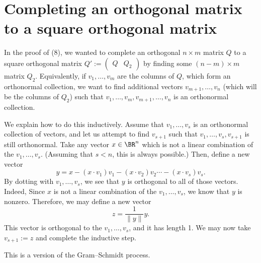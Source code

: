 \documentclass[10pt]{amsart}
\theoremstyle{mythm}
\theoremstyle{definition}
\theoremstyle{myrmk}
\begin{document}
	\newpage
	
	\section{Completing an orthogonal matrix to a square orthogonal matrix} 
	
	In the proof of (8), we wanted to complete an orthogonal $n \times m$ matrix $Q$ to a square orthogonal matrix $Q' := \left( \begin{array}{c|c} Q & Q_2 \end{array} \right)$ by finding some $(n-m) \times m$ matrix $Q_2$. Equivalently, if $v_1, \ldots, v_m$ are the columns of $Q$, which form an orthonormal collection, we want to find additional vectors $v_{m+1}, \ldots, v_n$ (which will be the columns of $Q_2$) such that $v_1, \ldots, v_m, v_{m+1}, \ldots,  v_n$ is an orthonormal collection. 
	
	We explain how to do this inductively. Assume that $v_1, \ldots, v_s$ is an orthonormal collection of vectors, and let us attempt to find $v_{s+1}$ such that $v_1, \ldots, v_{s}, v_{s+1}$ is still orthonormal. Take any vector $x \in \BR^n$ which is not a linear combination of the $v_1, \ldots, v_s$. (Assuming that $s < n$, this is always possible.) Then, define a new vector 
	\[
	y = x - (x \cdot v_1)v_1 - (x \cdot v_2)v_2\cdots - (x \cdot v_s)v_s. 
	\]
	By dotting with $v_1, \ldots, v_s$, we see that $y$ is orthogonal to all of those vectors. Indeed, 
	Since $x$ is not a linear combination of the $v_1, \ldots, v_s$, we know that $y$ is nonzero. Therefore, we may define a new vector 
	\[
	z = \frac{1}{\lVert y \rVert} y. 
	\]
	This vector is orthogonal to the $v_1, \ldots, v_s$, and it has length 1. We may now take $v_{s+1} := z$ and complete the inductive step. 
	
	This is a version of the Gram--Schmidt process. 
	
	
	
	
	
	
\end{document}
